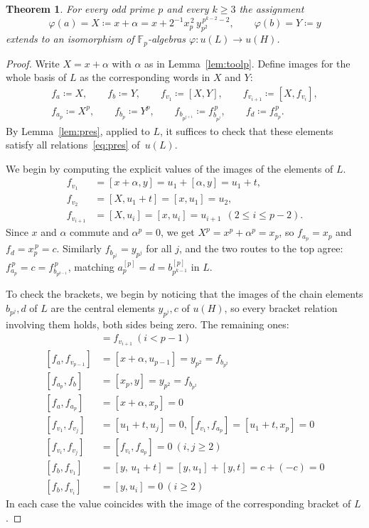 \documentclass[11pt,reqno]{amsart}
\theoremstyle{plain}
\newtheorem{theorem}{Theorem}[section]
\theoremstyle{remark}
\newcommand{\Fp}{\mathbb{F}_p}
\begin{document}
\begin{theorem}\label{thm:oddp}
For every odd prime $p$ and every $k\ge3$ the assignment
\[
\varphi(a)=X\coloneqq  x + \alpha = x+2^{-1}x_p^{\,2}\,y_{p^2}^{\,p^{k-2}-2},\qquad
\varphi(b)=Y\coloneqq y
\]
extends to an isomorphism of $\Fp$-algebras
$\varphi\colon u(L)\to u(H)$.
\end{theorem}

\begin{proof}
Write $X=x+\alpha$ with $\alpha$ as in Lemma~\ref{lem:toolp}. Define images
for the whole basis of $L$ as the corresponding words in $X$ and $Y$:
\begin{gather*}
f_a\coloneqq X,\qquad f_b\coloneqq Y,\qquad f_{v_1}\coloneqq [X,Y],\qquad f_{v_{i+1}}\coloneqq [X,f_{v_i}],\\
f_{a_p}\coloneqq X^p,\qquad f_{b_p}\coloneqq Y^p,\qquad
f_{b_{p^{j+1}}}\coloneqq f_{b_{p^j}}^{\,p},\qquad f_d\coloneqq f_{a_p}^{\,p}.
\end{gather*}
By Lemma~\ref{lem:pres}, applied to $L$, it suffices to check that these
elements satisfy all relations~\eqref{eq:pres} of~$u(L)$.

We begin by computing the explicit values of the images of the elements of $L$. 
\begin{align*}
f_{v_1}&=[x+\alpha,y]=u_1+[\alpha,y]=u_1+t, \\[2pt] 
f_{v_2}&=[X,u_1+t]=[x,u_1]=u_2,\\[2pt]
f_{v_{i+1}}&=[X,u_i]=[x,u_i]=u_{i+1}\ \ (2\le i\le p-2).
\end{align*}
Since $x$ and $\alpha$ commute and $\alpha^p=0$, we get
$X^p=x^p+\alpha^p=x_p$, so $f_{a_p}=x_p$ and
$f_d=x_p^{\,p}=c$. Similarly $f_{b_{p^j}}=y_{p^j}$ for all $j$, and the two
routes to the top agree:
$f_{a_p}^{\,p}=c=f_{b_{p^{k-1}}}^{\,p}$, matching
$a_p^{[p]}=d=b_{p^{k-1}}^{[p]}$ in $L$.

To check the brackets, we begin by noticing that the images of the chain elements $b_{p^j},d$
of $L$ are the central elements $y_{p^j},c$ of $u(H)$, so every bracket
relation involving them holds, both sides being zero. The remaining ones:
\begin{align*}
[f_a,f_{v_i}]&=f_{v_{i+1}}\ (i<p-1) \\[2pt]
[f_a,f_{v_{p-1}}]&=[x+\alpha,u_{p-1}]=y_{p^2}=f_{b_{p^2}} \\[2pt]
[f_{a_p},f_b]&=[x_p,y]=y_{p^2}=f_{b_{p^2}} \\[2pt]
[f_a,f_{a_p}]&=[x+\alpha,x_p]=0 \\[2pt]
[f_{v_1},f_{v_j}]&=[u_1+t,u_j]=0, [f_{v_1},f_{a_p}]=[u_1+t,x_p]=0 \\[2pt]
[f_{v_i},f_{v_j}]&=[f_{v_i},f_{a_p}]=0\ (i,j\ge2) \\[2pt]
[f_b,f_{v_1}]&=[y,\,u_1+t]=[y,u_1]+[y,t]=c+(-c)=0 \\[2pt]
[f_b,f_{v_i}]&=[y,u_i]=0\ (i\ge2)
\end{align*}
In each case the value coincides with the image of the corresponding bracket
of $L$. 


\end{proof}
\end{document}
